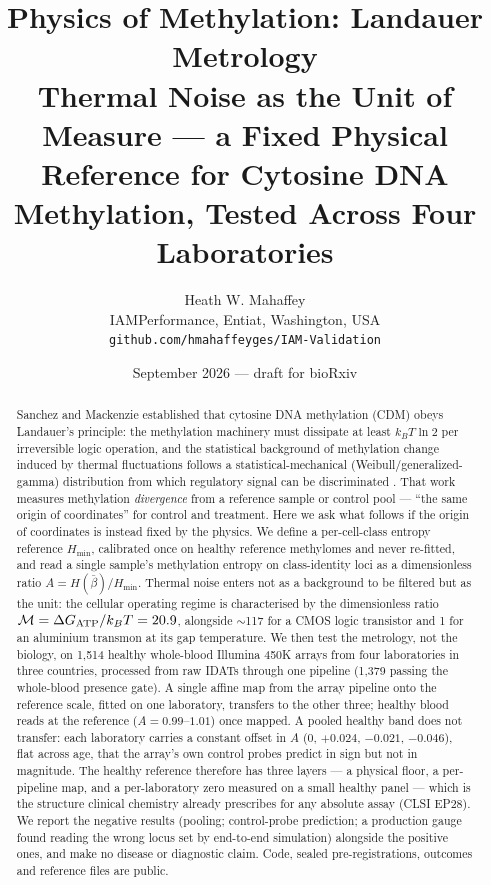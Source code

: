 \documentclass[12pt,a4paper]{article}
\title{\textbf{Physics of Methylation: Landauer Metrology}\\[4pt]
\large Thermal Noise as the Unit of Measure --- a Fixed Physical Reference for Cytosine DNA Methylation, Tested Across Four Laboratories}
\author{Heath W. Mahaffey\\ \small IAMPerformance, Entiat, Washington, USA\\ \small \texttt{github.com/hmahaffeyges/IAM-Validation}}
\date{September 2026 --- draft for bioRxiv}
\begin{document}
\maketitle

\begin{abstract}
Sanchez and Mackenzie established that cytosine DNA methylation (CDM) obeys Landauer's principle: the methylation machinery must dissipate at least $k_B T\ln 2$ per irreversible logic operation, and the statistical background of methylation change induced by thermal fluctuations follows a statistical-mechanical (Weibull/generalized-gamma) distribution from which regulatory signal can be discriminated \citep{sanchez2016,sanchez2019}. That work measures methylation \emph{divergence} from a reference sample or control pool --- ``the same origin of coordinates'' for control and treatment. Here we ask what follows if the origin of coordinates is instead fixed by the physics. We define a per-cell-class entropy reference $H_{\min}$, calibrated once on healthy reference methylomes and never re-fitted, and read a single sample's methylation entropy on class-identity loci as a dimensionless ratio $A = H(\bar\beta)/H_{\min}$. Thermal noise enters not as a background to be filtered but as the unit: the cellular operating regime is characterised by the dimensionless ratio $\mathcal{M} = \Delta G_{\rm ATP}/k_B T = 20.9$, alongside $\sim$117 for a CMOS logic transistor and 1 for an aluminium transmon at its gap temperature. We then test the metrology, not the biology, on 1,514 healthy whole-blood Illumina 450K arrays from four laboratories in three countries, processed from raw IDATs through one pipeline (1,379 passing the whole-blood presence gate). A single affine map from the array pipeline onto the reference scale, fitted on one laboratory, transfers to the other three; healthy blood reads at the reference ($A = 0.99$--$1.01$) once mapped. A pooled healthy band does not transfer: each laboratory carries a constant offset in $A$ ($0$, $+0.024$, $-0.021$, $-0.046$), flat across age, that the array's own control probes predict in sign but not in magnitude. The healthy reference therefore has three layers --- a physical floor, a per-pipeline map, and a per-laboratory zero measured on a small healthy panel --- which is the structure clinical chemistry already prescribes for any absolute assay (CLSI EP28). We report the negative results (pooling; control-probe prediction; a production gauge found reading the wrong locus set by end-to-end simulation) alongside the positive ones, and make no disease or diagnostic claim. Code, sealed pre-registrations, outcomes and reference files are public.
\end{abstract}
\end{document}
